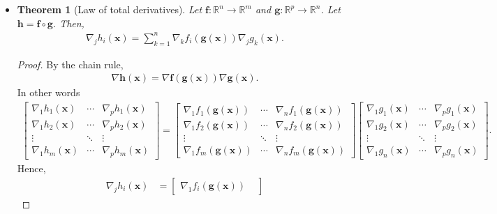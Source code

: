 \documentclass[10pt]{article}
\newtheorem{theorem}[lemma]{Theorem}
\newcommand{\ve}[1]{\mathbf{#1}}
\newcommand{\Real}{\mathbb{R}}
\begin{document}
\begin{itemize}
  \item \begin{theorem}[Law of total derivatives]
    Let $\ve{f}: \Real^n \rightarrow \Real^m$ and $\ve{g}: \Real^p \rightarrow \Real^n$. Let $\ve{h} = \ve{f} \circ \ve{g}$. Then,
    \begin{align*}
      \nabla_j h_i(\ve{x}) = \sum_{k=1}^n \nabla_k f_i(\ve{g}(\ve{x})) \nabla_j g_k(\ve{x}).
    \end{align*}    
  \end{theorem}
  \begin{proof}
    By the chain rule,
    \begin{align*}
      \nabla \ve{h}(\ve{x}) = \nabla \ve{f}(\ve{g}(\ve{x})) \nabla \ve{g}(\ve{x}).
    \end{align*}
    In other words
    \begin{align*}
      \begin{bmatrix}
        \nabla_1 h_1(\ve{x}) & \cdots & \nabla_p h_1(\ve{x}) \\
        \nabla_1 h_2(\ve{x}) & \cdots & \nabla_p h_2(\ve{x}) \\
        \vdots & \ddots & \vdots \\
        \nabla_1 h_m(\ve{x}) & \cdots & \nabla_p h_m(\ve{x})
      \end{bmatrix}
      = \begin{bmatrix}
        \nabla_1 f_1(\ve{g}(\ve{x})) & \cdots & \nabla_n f_1(\ve{g}(\ve{x})) \\
        \nabla_1 f_2(\ve{g}(\ve{x})) & \cdots & \nabla_n f_2(\ve{g}(\ve{x})) \\
        \vdots & \ddots & \vdots \\
        \nabla_1 f_m(\ve{g}(\ve{x})) & \cdots & \nabla_n f_m(\ve{g}(\ve{x}))
      \end{bmatrix}
      \begin{bmatrix}
        \nabla_1 g_1(\ve{x}) & \cdots & \nabla_p g_1(\ve{x}) \\
        \nabla_1 g_2(\ve{x}) & \cdots & \nabla_p g_2(\ve{x}) \\
        \vdots & \ddots & \vdots \\
        \nabla_1 g_n(\ve{x}) & \cdots & \nabla_p g_n(\ve{x})
      \end{bmatrix}.
    \end{align*}
    Hence,
    \begin{align*}
      \nabla_j h_i(\ve{x}) 
      &=
      \begin{bmatrix}
        \nabla_1 f_i(\ve{g}(\ve{x})) & 

\end{bmatrix}
\end{align*}
\end{proof}
\end{itemize}
\end{document}
